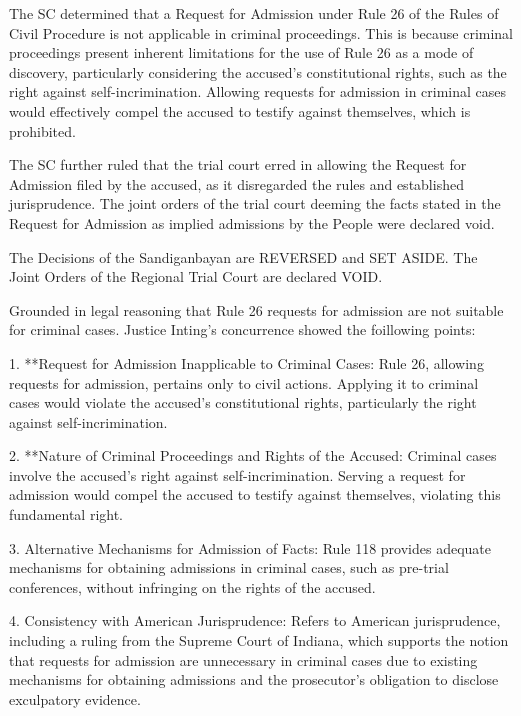 \documentclass[
12pt,
oneside,
onehalfspacing,
headsepline
]{DigestCollection}
\begin{document}
The SC determined that a Request for Admission under Rule 26 of the Rules of Civil Procedure is not applicable in criminal proceedings. This is because criminal proceedings present inherent limitations for the use of Rule 26 as a mode of discovery, particularly considering the accused's constitutional rights, such as the right against self-incrimination. Allowing requests for admission in criminal cases would effectively compel the accused to testify against themselves, which is prohibited.

The SC further ruled that the trial court erred in allowing the Request for Admission filed by the accused, as it disregarded the rules and established jurisprudence. The joint orders of the trial court deeming the facts stated in the Request for Admission as implied admissions by the People were declared void.

The Decisions of the Sandiganbayan are REVERSED and SET ASIDE. The Joint Orders of the Regional Trial Court are declared VOID. 

\label{3171f0c0-0a10-11ef-932c-63c852f65e48}


Grounded in legal reasoning that Rule 26 requests for admission are not suitable for criminal cases. Justice Inting's concurrence showed the foillowing points:

1. **Request for Admission Inapplicable to Criminal Cases: Rule 26, allowing requests for admission, pertains only to civil actions. Applying it to criminal cases would violate the accused's constitutional rights, particularly the right against self-incrimination.

2. **Nature of Criminal Proceedings and Rights of the Accused: Criminal cases involve the accused's right against self-incrimination. Serving a request for admission would compel the accused to testify against themselves, violating this fundamental right.

3. Alternative Mechanisms for Admission of Facts: Rule 118 provides adequate mechanisms for obtaining admissions in criminal cases, such as pre-trial conferences, without infringing on the rights of the accused.

4. Consistency with American Jurisprudence: Refers to American jurisprudence, including a ruling from the Supreme Court of Indiana, which supports the notion that requests for admission are unnecessary in criminal cases due to existing mechanisms for obtaining admissions and the prosecutor's obligation to disclose exculpatory evidence.
\end{document}
